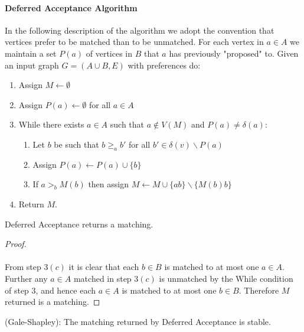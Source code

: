 \paragraph{Deferred Acceptance Algorithm}
In the following description of the algorithm we adopt the convention that vertices prefer to be matched than to be unmatched. For each vertex in $a\in A$ we maintain a set $P(a)$ of vertices in $B$ that $a$ has previously "proposed" to. Given an input graph $G=(A \cup B, E)$ with preferences do:
\begin{enumerate}
\item Assign $M \leftarrow \emptyset$
\item Assign $P(a) \leftarrow \emptyset$ for all $a \in A$
\item While there exists $a \in A$ such that $a \not\in V(M)$ and $P(a) \neq \delta(a)$:
	\begin{enumerate}
	\item Let $b$ be such that $b \geq_a b'$ for all $b' \in \delta(v) \backslash P(a)$
	\item Assign $P(a) \leftarrow P(a) \cup \{b\}$
	\item If $a >_b M(b)$ then assign $M \leftarrow M \cup \{ab\} \backslash \{M(b)b\}$
	\end{enumerate}
\item Return $M$.
\end{enumerate}
\begin{lemma} Deferred Acceptance returns a matching.
\end{lemma}
\begin{proof}
\paragraph{}
From step $3(c)$ it is clear that each $b \in B$ is matched to at most one $a \in A$. Further any $a \in A$ matched in step $3(c)$ is unmatched by the While condition of step $3$, and hence each $a \in A$ is matched to at most one $b \in B$. Therefore $M$ returned is a matching. \end{proof}
\begin{theorem}(Gale-Shapley): The matching returned by Deferred Acceptance is stable.
\end{theorem}
